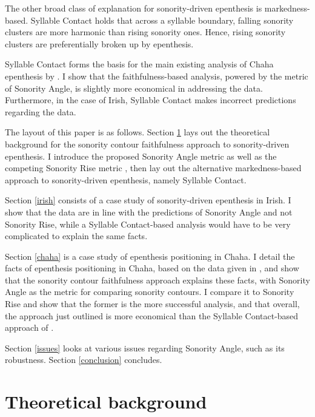 \documentclass[12pt]{article}
\begin{document}
\bigskip

The other broad class of explanation for sonority-driven epenthesis is markedness-based.  Syllable Contact \citep{murray.vennemann.1983} holds that across a syllable boundary, falling sonority clusters are more harmonic than rising sonority ones.  Hence, rising sonority clusters are preferentially broken up by epenthesis.

Syllable Contact forms the basis for the main existing analysis of Chaha epenthesis by \citet{rose.2000}.  I show that the faithfulness-based analysis, powered by the metric of {\sc Sonority Angle}, is slightly more economical in addressing the data. Furthermore, in the case of Irish, Syllable Contact makes incorrect predictions regarding the data.

\bigskip

The layout of this paper is as follows.  Section \ref{theoreticalmachinery} lays out the theoretical background for the sonority contour faithfulness approach to 
sonority-driven epenthesis. I introduce the proposed {\sc Sonority Angle} metric as well as the competing {\sc Sonority Rise} metric \citep{flemming.2008}, 
then lay out the alternative markedness-based approach to sonority-driven epenthesis, namely {\sc Syllable Contact}.

Section \ref{irish} consists of a case study of sonority-driven epenthesis in Irish.  I show that the data are in line with the predictions of {\sc Sonority Angle} and not {\sc Sonority Rise}, while a Syllable Contact-based analysis would have to be very complicated to explain the same facts.

Section \ref{chaha} is a case study of epenthesis positioning in Chaha.  I detail the facts of epenthesis positioning in Chaha, based on the data given in \citet{rose.2000},
and show that the sonority contour faithfulness approach explains these facts, with {\sc Sonority Angle} as the metric for comparing sonority contours.  I compare it to {\sc Sonority Rise} and show that the former is the more successful analysis, and that overall, the approach just outlined is more economical than the  Syllable Contact-based approach of \citet{rose.2000}.

Section \ref{issues} looks at various issues regarding {\sc Sonority Angle}, such as its robustness. Section \ref{conclusion} concludes.

\section{Theoretical background} \label{theoreticalmachinery}
\end{document}
